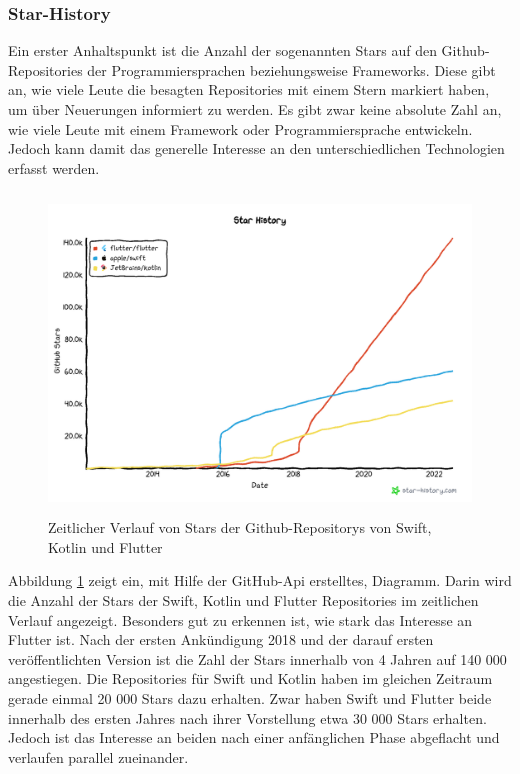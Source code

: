 \subsubsection{Star-History}
Ein erster Anhaltspunkt ist die Anzahl der sogenannten Stars auf den Github-Repositories der Programmiersprachen beziehungsweise Frameworks. Diese gibt an, wie viele Leute die besagten Repositories mit einem Stern markiert haben, um über Neuerungen informiert zu werden. Es gibt zwar keine absolute Zahl an, wie viele Leute mit einem Framework oder Programmiersprache entwickeln. Jedoch kann damit das generelle Interesse an den unterschiedlichen Technologien erfasst werden.

\begin{figure}[ht]
  \centering
  \includegraphics[height=8.5cm,keepaspectratio]{images/star-history_programming languages.png} 
  \caption[Zeitlicher Verlauf von Stars der Github-Repositorys von Swift, Kotlin und Flutter]{Zeitlicher Verlauf von Stars der Github-Repositorys von Swift, Kotlin und Flutter\protect\footnotemark }
  \label{fig:star_history}
\end{figure}



Abbildung \ref{fig:star_history} zeigt ein, mit Hilfe der GitHub-Api erstelltes, Diagramm. Darin wird die Anzahl der Stars der Swift, Kotlin und Flutter Repositories im zeitlichen Verlauf angezeigt. 
Besonders gut zu erkennen ist, wie stark das Interesse an Flutter ist. Nach der ersten Ankündigung 2018 und der darauf ersten veröffentlichten Version ist die Zahl der Stars innerhalb von 4 Jahren auf 140 000 angestiegen. Die Repositories für Swift und Kotlin haben im gleichen Zeitraum gerade einmal 20 000 Stars dazu erhalten. Zwar haben Swift und Flutter beide innerhalb des ersten Jahres nach ihrer Vorstellung etwa 30 000 Stars erhalten. Jedoch ist das Interesse an beiden nach einer anfänglichen Phase abgeflacht und verlaufen parallel zueinander.

